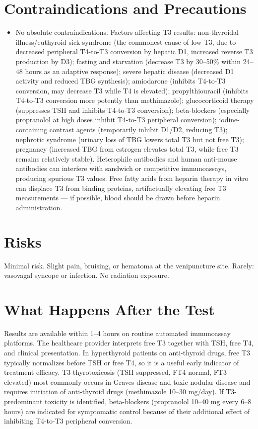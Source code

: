 \section*{Contraindications and Precautions}
\begin{itemize}
  \item No absolute contraindications. Factors affecting T3 results: non-thyroidal illness/euthyroid sick syndrome (the commonest cause of low T3, due to decreased peripheral T4-to-T3 conversion by hepatic D1, increased reverse T3 production by D3); fasting and starvation (decrease T3 by 30--50\% within 24--48 hours as an adaptive response); severe hepatic disease (decreased D1 activity and reduced TBG synthesis); amiodarone (inhibits T4-to-T3 conversion, may decrease T3 while T4 is elevated); propylthiouracil (inhibits T4-to-T3 conversion more potently than methimazole); glucocorticoid therapy (suppresses TSH and inhibits T4-to-T3 conversion); beta-blockers (especially propranolol at high doses inhibit T4-to-T3 peripheral conversion); iodine-containing contrast agents (temporarily inhibit D1/D2, reducing T3); nephrotic syndrome (urinary loss of TBG lowers total T3 but not free T3); pregnancy (increased TBG from estrogen elevates total T3, while free T3 remains relatively stable). Heterophile antibodies and human anti-mouse antibodies can interfere with sandwich or competitive immunoassays, producing spurious T3 values. Free fatty acids from heparin therapy in vitro can displace T3 from binding proteins, artifactually elevating free T3 measurements --- if possible, blood should be drawn before heparin administration.
\end{itemize}
\section*{Risks}
Minimal risk. Slight pain, bruising, or hematoma at the venipuncture site. Rarely: vasovagal syncope or infection. No radiation exposure.

\section*{What Happens After the Test}
Results are available within 1--4 hours on routine automated immunoassay platforms. The healthcare provider interprets free T3 together with TSH, free T4, and clinical presentation. In hyperthyroid patients on anti-thyroid drugs, free T3 typically normalizes before TSH or free T4, so it is a useful early indicator of treatment efficacy. T3 thyrotoxicosis (TSH suppressed, FT4 normal, FT3 elevated) most commonly occurs in Graves disease and toxic nodular disease and requires initiation of anti-thyroid drugs (methimazole 10--30 mg/day). If T3-predominant toxicity is identified, beta-blockers (propranolol 10--40 mg every 6--8 hours) are indicated for symptomatic control because of their additional effect of inhibiting T4-to-T3 peripheral conversion.

